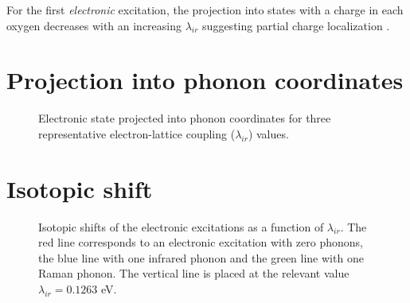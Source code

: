 For the first \textit{electronic} excitation, the projection into states with a charge in each oxygen decreases with an increasing $\lambda_{ir}$ suggesting partial charge localization \cite{GarciaSaraviaOrtizdeMontellano2013}.

\section{Projection into phonon coordinates}

\begin{figure}[ht]
  \centering
  
  \caption{Electronic state projected into phonon coordinates for three representative electron-lattice coupling ($\lambda_{ir}$) values.}
  \label{fig:phononProjElectr}
\end{figure}

\section{Isotopic shift}

\begin{figure}[ht]
  \centering
  
  \caption[Isotopic shift of the electronic excitations as a function of $\lambda_{ir}$.]
  {Isotopic shifts of the electronic excitations as a function of $\lambda_{ir}$. 
    The red line corresponds to an electronic excitation with zero phonons, the blue line with one infrared phonon and the green line with one Raman phonon.
    The vertical line is placed at the relevant value $\lambda_{ir}=0.1263$ eV.}
  \label{fig:electrIsot}
\end{figure}

